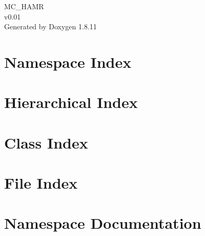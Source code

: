 \documentclass[twoside]{book}
\newcommand{\+}{\discretionary{\mbox{\scriptsize$\hookleftarrow$}}{}{}}
\newcommand{\clearemptydoublepage}{%
  \newpage{\pagestyle{empty}\cleardoublepage}%
}
\begin{document}
\hypersetup{pageanchor=false,
             bookmarksnumbered=true,
             pdfencoding=unicode
            }
\begin{titlepage}
\vspace*{7cm}
\begin{center}%
{\Large M\+C\+\_\+\+H\+A\+MR \\[1ex]\large v0.\+01 }\\
\vspace*{1cm}
{\large Generated by Doxygen 1.8.11}\\
\end{center}
\end{titlepage}
\clearemptydoublepage
\tableofcontents
\clearemptydoublepage
{}
\hypersetup{pageanchor=true}

\chapter{Namespace Index}

\chapter{Hierarchical Index}

\chapter{Class Index}

\chapter{File Index}

\chapter{Namespace Documentation}




\end{document}
